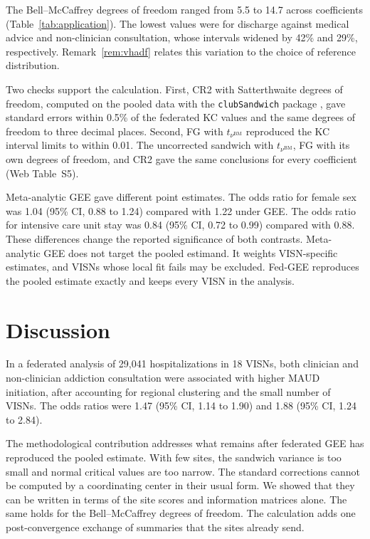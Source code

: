 \documentclass[12pt]{article}
\theoremstyle{remark}
\begin{document}
The Bell--McCaffrey degrees of freedom ranged from 5.5 to 14.7 across
coefficients (Table~\ref{tab:application}). The lowest values were for discharge
against medical advice and non-clinician consultation, whose intervals widened
by 42\% and 29\%, respectively. Remark~\ref{rem:vhadf} relates this variation
to the choice of reference distribution.

Two checks support the calculation. First, CR2 with Satterthwaite degrees of
freedom, computed on the pooled data with the \texttt{clubSandwich} package
\citep{pustejovsky2018small}, gave standard errors within 0.5\% of the federated
KC values and the same degrees of freedom to three decimal places. Second, FG
with $t_{\nu^{\mathrm{BM}}}$ reproduced the KC interval limits to within 0.01.
The uncorrected sandwich with $t_{\nu^{\mathrm{BM}}}$, FG with its own degrees of
freedom, and CR2 gave the same conclusions for every coefficient (Web
Table~S5).

Meta-analytic GEE gave different point estimates. The odds ratio for female sex
was 1.04 (95\% CI, 0.88 to 1.24) compared with 1.22 under GEE. The odds ratio for
intensive care unit stay was 0.84 (95\% CI, 0.72 to 0.99) compared with 0.88.
These differences change the reported significance of both contrasts. Meta-analytic
GEE does not target the pooled estimand. It weights VISN-specific estimates, and
VISNs whose local fit fails may be excluded. Fed-GEE reproduces the pooled
estimate exactly and keeps every VISN in the analysis.

\section{Discussion}
\label{sec:discussion}

In a federated analysis of 29{,}041 hospitalizations in 18 VISNs, both clinician
and non-clinician addiction consultation were associated with higher MAUD
initiation, after accounting for regional clustering and the small number of
VISNs. The odds ratios were 1.47 (95\% CI, 1.14 to 1.90) and 1.88 (95\% CI, 1.24
to 2.84).

The methodological contribution addresses what remains after federated GEE has
reproduced the pooled estimate. With few sites, the
sandwich variance is too small and normal critical values are too narrow. The
standard corrections cannot be computed by a coordinating center in their usual
form. We showed that they can be written in terms of the site scores and
information matrices alone. The same holds for the Bell--McCaffrey degrees of
freedom. The calculation adds one post-convergence exchange of summaries that
the sites already send.
\end{document}
